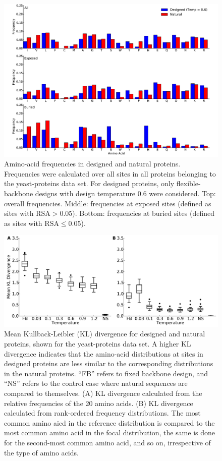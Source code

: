 \documentclass[12pt]{article}
\begin{document}
\begin{figure}[H]
\centerline{\includegraphics[width = 5in]{figures/Duncan_Freq_Combo_Plots_06.pdf}}
\caption{Amino-acid frequencies in designed and natural proteins. Frequencies were calculated over all sites in all proteins belonging to the yeast-proteins data set. For designed proteins, only flexible-backbone designs with design temperature 0.6 were considered. Top: overall frequencies. Middle: frequencies at exposed sites (defined as sites with $\text{RSA}>0.05$). Bottom: frequencies at buried sites (defined as sites with $\text{RSA}\leq0.05$).}
\label{AAFreqsYeastProteins}
\end{figure}


\begin{figure}[H]
\centerline{\includegraphics[width = 6in]{figures/Mean_KL_vs_Temp_Boxplot.pdf}}
\caption{Mean Kullback-Leibler (KL) divergence for designed and natural proteins, shown for the yeast-proteins data set. A higher KL divergence indicates that the amino-acid distributions at sites in designed proteins are less similar to the corresponding distributions in the natural proteins. ``FB'' refers to fixed backbone design, and ``NS'' refers to the control case where natural sequences are compared to themselves. (A) KL divergence calculated from the relative frequencies of the 20 amino acids. (B) KL divergence calculated from rank-ordered frequency distributions. The most common amino aicd in the reference distribution is compared to the most common amino acid in the focal distribution, the same is done for the second-most common amino acid, and so on, irrespective of the type of amino acids.}
\label{AADisFig1}
\end{figure}
\end{document}
